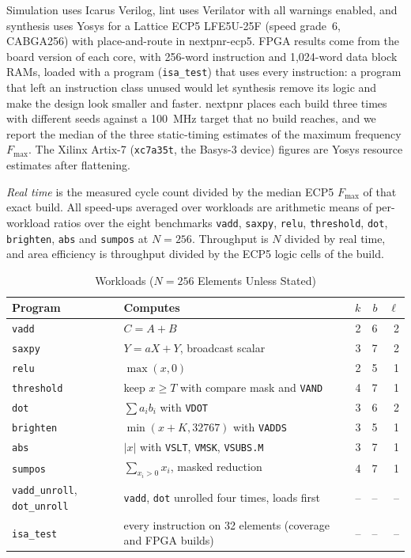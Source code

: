 Simulation uses Icarus Verilog, lint uses Verilator with all warnings enabled, and
synthesis uses Yosys for a Lattice ECP5 LFE5U-25F (speed grade~6, CABGA256) with
place-and-route in nextpnr-ecp5. FPGA results come from the board version of each core,
with 256-word instruction and 1,024-word data block RAMs, loaded with a program
(\texttt{isa\_test}) that uses every instruction: a program that left an instruction
class unused would let synthesis remove its logic and make the design look smaller and
faster. nextpnr places each build three times with different seeds against a 100~MHz
target that no build reaches, and we report the median of the three static-timing
estimates of the maximum frequency $F_{\max}$. The Xilinx Artix-7 (\texttt{xc7a35t}, the
Basys-3 device) figures are Yosys resource estimates after flattening.

\emph{Real time} is the measured cycle count divided by the median ECP5 $F_{\max}$ of that
exact build. All speed-ups averaged over workloads are arithmetic means of per-workload
ratios over the eight benchmarks \texttt{vadd}, \texttt{saxpy}, \texttt{relu},
\texttt{threshold}, \texttt{dot}, \texttt{brighten}, \texttt{abs} and \texttt{sumpos}
at $N = 256$. Throughput is $N$ divided by real time, and area efficiency is
throughput divided by the ECP5 logic cells of the build.

\begin{table}[t]
\centering
\caption{Workloads ($N = 256$ Elements Unless Stated)}
\label{tab:work2}
\footnotesize
\setlength{\tabcolsep}{3pt}
\begin{tabular}{@{}lL{3.7cm}rrr@{}}
\toprule
Program & Computes & $k$ & $b$ & $\ell$ \\
\midrule
\texttt{vadd}      & $C = A + B$ & 2 & 6 & 2 \\
\texttt{saxpy}     & $Y = aX + Y$, broadcast scalar & 3 & 7 & 2 \\
\texttt{relu}      & $\max(x, 0)$ & 2 & 5 & 1 \\
\texttt{threshold} & keep $x \geq T$ with compare mask and \texttt{VAND} & 4 & 7 & 1 \\
\texttt{dot}       & $\sum a_i b_i$ with \texttt{VDOT} & 3 & 6 & 2 \\
\texttt{brighten}  & $\min(x + K, 32767)$ with \texttt{VADDS} & 3 & 5 & 1 \\
\texttt{abs}       & $|x|$ with \texttt{VSLT}, \texttt{VMSK}, \texttt{VSUBS.M} & 3 & 7 & 1 \\
\texttt{sumpos}    & $\sum_{x_i > 0} x_i$, masked reduction & 4 & 7 & 1 \\
\texttt{vadd\_unroll}, \texttt{dot\_unroll} & \texttt{vadd}, \texttt{dot} unrolled four times, loads first & -- & -- & -- \\
\texttt{isa\_test} & every instruction on 32 elements (coverage and FPGA builds) & -- & -- & -- \\
\bottomrule
\end{tabular}
\end{table}

